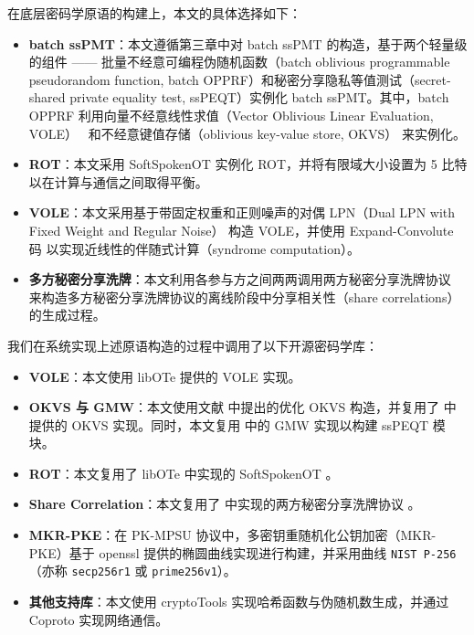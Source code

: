 在底层密码学原语的构建上，本文的具体选择如下：
\begin{itemize}
\item \textbf{batch ssPMT}：本文遵循第三章中对 batch ssPMT 的构造，基于两个轻量级的组件 —— 批量不经意可编程伪随机函数（batch oblivious programmable pseudorandom function, batch OPPRF）和秘密分享隐私等值测试（secret-shared private equality test, ssPEQT）实例化 batch ssPMT。其中，batch OPPRF 利用向量不经意线性求值（Vector Oblivious Linear Evaluation, VOLE）~\cite{BCGIKRS19,BCGIKS19,RRT23} 和不经意键值存储（oblivious key-value store, OKVS） \cite{PRTY20,GPRTY-CRYPTO-2021,RR-CCS-2022,BPSY-USENIX-2023} 来实例化。
\item \textbf{ROT}：本文采用 SoftSpokenOT \cite{Roy22} 实例化 ROT，并将有限域大小设置为 5 比特以在计算与通信之间取得平衡。
\item \textbf{VOLE}：本文采用基于带固定权重和正则噪声的对偶 LPN（Dual LPN with Fixed Weight and Regular Noise） \cite{BCGIKRS19,BCGIKS19} 构造 VOLE，并使用 Expand-Convolute 码 \cite{RRT23} 以实现近线性的伴随式计算（syndrome computation）。
\item \textbf{多方秘密分享洗牌}：本文利用各参与方之间两两调用两方秘密分享洗牌协议 \cite{MS13,CGP-ASIACRYPT-2020} 来构造多方秘密分享洗牌协议的离线阶段中分享相关性（share correlations）的生成过程。
\end{itemize}

我们在系统实现上述原语构造的过程中调用了以下开源密码学库：
\begin{itemize}
\item \textbf{VOLE}：本文使用 \textsf{libOTe} \cite{libOTe} 提供的 VOLE 实现。
\item \textbf{OKVS 与 GMW}：本文使用文献 \cite{RR-CCS-2022} 中提出的优化 OKVS 构造，并复用了 \cite{lib-volepsi} 中提供的 OKVS 实现。同时，本文复用 \cite{lib-volepsi} 中的 GMW 实现以构建 ssPEQT 模块。
\item \textbf{ROT}：本文复用了 \textsf{libOTe} 中实现的 SoftSpokenOT \cite{Roy22}。
\item \textbf{Share Correlation}：本文复用了 \cite{lib-psu} 中实现的两方秘密分享洗牌协议 \cite{MS13,CGP-ASIACRYPT-2020}。
\item \textbf{MKR-PKE}：在 PK-MPSU 协议中，多密钥重随机化公钥加密（MKR-PKE）基于 \textsf{openssl} \cite{lib-openssl} 提供的椭圆曲线实现进行构建，并采用曲线 \texttt{NIST P-256}（亦称 \texttt{secp256r1} 或 \texttt{prime256v1}）。
\item \textbf{其他支持库}：本文使用 \textsf{cryptoTools} \cite{lib-cryptoTools} 实现哈希函数与伪随机数生成，并通过 \textsf{Coproto} \cite{lib-coproto} 实现网络通信。
\end{itemize}

